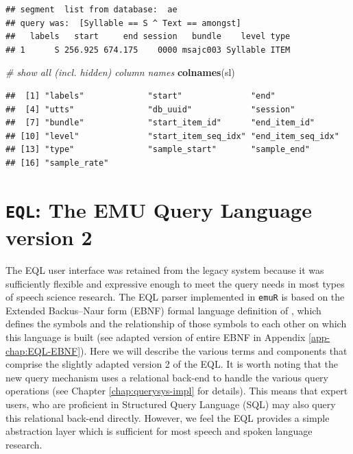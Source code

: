 \documentclass[]{book}
\newenvironment{Shaded}{\begin{snugshade}}{\end{snugshade}}
\newcommand{\CommentTok}[1]{\textcolor[rgb]{0.56,0.35,0.01}{\textit{#1}}}
\newcommand{\KeywordTok}[1]{\textcolor[rgb]{0.13,0.29,0.53}{\textbf{#1}}}
\newcommand{\NormalTok}[1]{#1}
\theoremstyle{definition}
\theoremstyle{definition}
\theoremstyle{definition}
\theoremstyle{remark}
\begin{document}
\begin{verbatim}
## segment  list from database:  ae 
## query was:  [Syllable == S ^ Text == amongst] 
##   labels   start     end session   bundle    level type
## 1      S 256.925 674.175    0000 msajc003 Syllable ITEM
\end{verbatim}

\begin{Shaded}
\begin{Highlighting}[]
\CommentTok{# show all (incl. hidden) column names}
\KeywordTok{colnames}\NormalTok{(sl)}
\end{Highlighting}
\end{Shaded}

\begin{verbatim}
##  [1] "labels"             "start"              "end"               
##  [4] "utts"               "db_uuid"            "session"           
##  [7] "bundle"             "start_item_id"      "end_item_id"       
## [10] "level"              "start_item_seq_idx" "end_item_seq_idx"  
## [13] "type"               "sample_start"       "sample_end"        
## [16] "sample_rate"
\end{verbatim}

\hypertarget{eql-the-emu-query-language-version-2}{%
\section{\texorpdfstring{\texttt{EQL}: The EMU Query Language version
2}{EQL: The EMU Query Language version 2}}\label{eql-the-emu-query-language-version-2}}

The EQL user interface was retained from the legacy system because it
was sufficiently flexible and expressive enough to meet the query needs
in most types of speech science research. The EQL parser implemented in
\texttt{emuR} is based on the Extended Backus--Naur form (EBNF)
\citep{garshol:2003a} formal language definition of \citet{john:2012a},
which defines the symbols and the relationship of those symbols to each
other on which this language is built (see adapted version of entire
EBNF in Appendix \ref{app-chap:EQL-EBNF}). Here we will describe the
various terms and components that comprise the slightly adapted version
2 of the EQL. It is worth noting that the new query mechanism uses a
relational back-end to handle the various query operations (see Chapter
\ref{chap:querysys-impl} for details). This means that expert users, who
are proficient in Structured Query Language (SQL) may also query this
relational back-end directly. However, we feel the EQL provides a simple
abstraction layer which is sufficient for most speech and spoken
language research.
\end{document}
